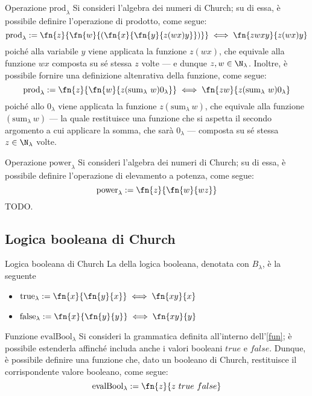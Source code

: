 \documentclass[a4paper, 12pt]{report}
\begin{document}
    \begin{framedobs}{Operazione $\mathrm{prod}_\lambda$}
        Si consideri l'algebra dei numeri di Church; su di essa, è possibile definire l'operazione di prodotto, come segue: $$\mathrm{prod}_\lambda := \fn{z}{\fn{w}{(\fn{x}{\fn{y}{z(wx)y}})}} \iff \fn{zwxy}{z(wx)y}$$ poiché alla variabile $y$ viene applicata la funzione $z(wx)$, che equivale alla funzione $wx$ composta su sé stessa $z$ volte --- e dunque $z, w \in \N_\lambda$. Inoltre, è possibile fornire una definizione altenrativa della funzione, come segue: $$\mathrm{prod}_\lambda := \fn{z}{\fn{w}{z (\mathrm{sum}_\lambda \ w)0_\lambda}} \iff \fn{zw}{z(\mathrm{sum}_\lambda \ w)0_\lambda}$$ poiché allo $0_\lambda$ viene applicata la funzione $z(\mathrm{sum}_\lambda \ w)$, che equivale alla funzione $(\mathrm{sum}_\lambda \ w)$ --- la quale restituisce una funzione che si aspetta il secondo argomento a cui applicare la somma, che sarà $0_\lambda$ --- composta su sé stessa $z \in \N_\lambda$ volte.
    \end{framedobs}

    \begin{framedobs}{Operazione $\mathrm{power}_\lambda$}
        Si consideri l'algebra dei numeri di Church; su di essa, è possibile definire l'operazione di elevamento a potenza, come segue: $$\mathrm{power}_\lambda := \fn{z}{\fn{w}{wz}}$$ TODO.
    \end{framedobs}

    \subsection{Logica booleana di Church}

    \begin{frameddefn}{Logica booleana di Church}
        La  della logica booleana, denotata con $B_\lambda$, è la seguente

        \begin{itemize}
            \item $\mathrm{true}_\lambda := \fn{x}{\fn{y}{x}} \iff \fn{xy}{x}$
            \item $\mathrm{false}_\lambda := \fn{x}{\fn{y}{y}} \iff \fn{xy}{y}$
        \end{itemize}
    \end{frameddefn}

    \begin{framedobs}{Funzione $\mathrm{evalBool}_\lambda$}
        Si consideri la grammatica definita all'interno dell'\cref{fun}; è possibile estenderla affinché includa anche i valori booleani $true$ e $false$. Dunque, è possibile definire una funzione che, dato un booleano di Church, restituisce il corrispondente valore booleano, come segue: $$\mathrm{evalBool}_\lambda := \fn{z}{z \ true \ false}$$
    \end{framedobs}
\end{document}
